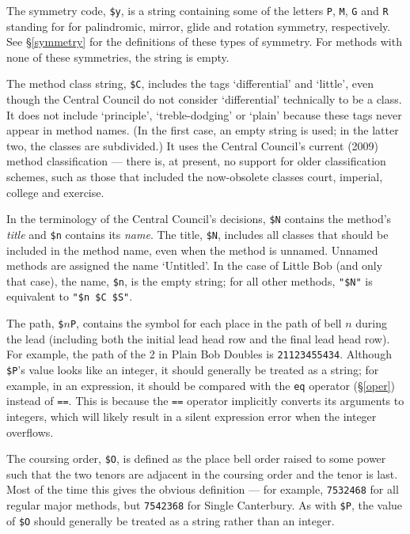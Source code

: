 \documentclass[a4paper,11pt,oneside]{book}
\makeatletter
\newcommand{\fspec}[1]{\index{#1@{\hspace*{-\fspecwidth}\texttt{\$#1}}}}
\newcommand{\sref}[1]{\hyperref[#1]{\S\ref{#1}}}
\makeatother
\begin{document}
The symmetry code, \verb+$y+\fspec{y}, is a string containing some of 
the letters \verb+P+, \verb+M+, \verb+G+ and \verb+R+ standing for
for palindromic, mirror, glide and rotation symmetry, respectively.  
See \sref{symmetry} for the definitions of these types of symmetry.  For
methods with none of these symmetries, the string is empty.

The method class string, \verb+$C+\fspec{C}, includes the tags `differential'
and `little', even though the Central Council do not consider `differential'
technically to be a class.  It does
not include `principle', `treble-dodging' or `plain' because these tags never
appear in method names.  (In the first case, an empty string is used; in 
the latter two, the classes are subdivided.)   It uses
the Central Council's current (2009) method classification%
 --- there is, at present, no support for 
older classification schemes, such as those that included the now-obsolete 
classes court, imperial, 
college and exercise.  

In the terminology of the Central Council's 
decisions, 
\verb+$N+ contains the method's \textit{title} 
and \verb+$n+ contains its \textit{name}.
The title, \verb+$N+\fspec{N}, includes all classes that should be 
included in the method name, even when the method is unnamed.  Unnamed methods
are assigned the name `Untitled'.  In the case of Little Bob (and only that 
case), the name, \verb+$n+, is the empty string; for all other methods,
\verb+"$N"+ is equivalent to \verb+"$n $C $S"+.

The path, \verb+$+$n$\verb+P+,\fspec{P} contains the symbol for
each place in the path of bell $n$ during the lead (including both the initial
lead head row and the final lead head row).  For example, the path of the 2
in Plain Bob Doubles is \verb+21123455434+.  Although \verb+$P+'s value
looks like an integer, it should generally be treated as a string; for example,
in an expression, it should be compared with the \verb+eq+ operator 
(\sref{oper}) instead of \verb+==+.  This is because the \verb+==+ operator
implicitly converts its arguments to integers, which will likely result in
a silent expression error when the integer overflows.

The coursing order, \verb+$O+\fspec{O}, is defined as
the place bell order raised to some power such that 
the two tenors are adjacent in the coursing order and the tenor is last.
Most of the time this gives the obvious definition --- for example, 
\verb+7532468+ for all regular major methods, but \verb+7542368+ for 
Single Canterbury.  As with \verb+$P+, the value of \verb+$O+ should generally
be treated as a string rather than an integer.
\end{document}
